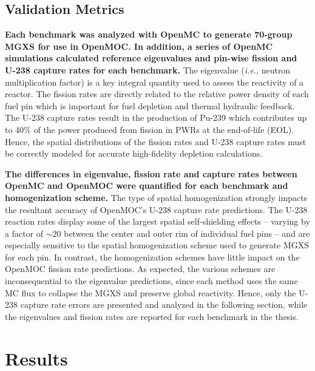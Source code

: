 \documentclass[12pt,twoside]{mitthesis-exec}
\begin{document}
\subsection*{Validation Metrics}

\textbf{Each benchmark was analyzed with OpenMC to generate 70-group MGXS for use in OpenMOC. In addition, a series of OpenMC simulations calculated reference eigenvalues and pin-wise fission and U-238 capture rates for each benchmark.} The eigenvalue (\textit{i.e.}, neutron multiplication factor) is a key integral quantity used to assess the reactivity of a reactor. The fission rates are directly related to the relative power density of each fuel pin which is important for fuel depletion and thermal hydraulic feedback. The U-238 capture rates result in the production of Pu-239 which contributes up to 40\% of the power produced from fission in PWRs at the end-of-life (EOL). Hence, the spatial distributions of the fission rates and U-238 capture rates must be correctly modeled for accurate high-fidelity depletion calculations. 

\textbf{The differences in eigenvalue, fission rate and capture rates between OpenMC and OpenMOC were quantified for each benchmark and homogenization scheme.} The type of spatial homogenization strongly impacts the resultant accuracy of OpenMOC's U-238 capture rate predictions. The U-238 reaction rates display some of the largest spatial self-shielding effects -- varying by a factor of $\sim$20 between the center and outer rim of individual fuel pins -- and are especially sensitive to the spatial homogenization scheme used to generate MGXS for each pin. In contrast, the homogenization schemes have little impact on the OpenMOC fission rate predictions. As expected, the various schemes are inconsequential to the eigenvalue predictions, since each method uses the same MC flux to collapse the MGXS and preserve global reactivity. Hence, only the U-238 capture rate errors are presented and analyzed in the following section, while the eigenvalues and fission rates are reported for each benchmark in the thesis.


\section*{Results}
\end{document}
